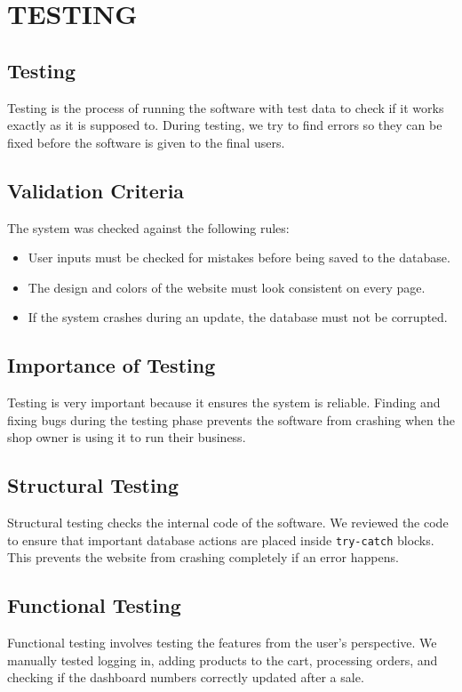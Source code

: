 \documentclass[12pt,a4paper]{report}
\begin{document}
\chapter{TESTING}

\section{Testing}
Testing is the process of running the software with test data to check if it works exactly as it is supposed to. During testing, we try to find errors so they can be fixed before the software is given to the final users.

\section{Validation Criteria}
The system was checked against the following rules:
\begin{itemize}
    \item User inputs must be checked for mistakes before being saved to the database.
    \item The design and colors of the website must look consistent on every page.
    \item If the system crashes during an update, the database must not be corrupted.
\end{itemize}

\section{Importance of Testing}
Testing is very important because it ensures the system is reliable. Finding and fixing bugs during the testing phase prevents the software from crashing when the shop owner is using it to run their business.

\section{Structural Testing}
Structural testing checks the internal code of the software. We reviewed the code to ensure that important database actions are placed inside \texttt{try-catch} blocks. This prevents the website from crashing completely if an error happens.

\section{Functional Testing}
Functional testing involves testing the features from the user's perspective. We manually tested logging in, adding products to the cart, processing orders, and checking if the dashboard numbers correctly updated after a sale.
\end{document}
